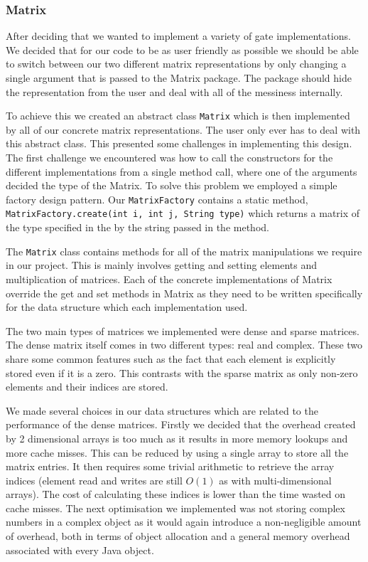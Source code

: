 \documentclass[bibliography=totocnumbered, 10pt]{article}
\theoremstyle{NoticeStyle}
\begin{document}
\subsubsection{Matrix}
After deciding that we wanted to implement a variety of gate implementations. We decided that for our code to be as user friendly as possible we should be able to switch between our two different matrix representations by only changing a single argument that is passed to the Matrix package. The package should hide the representation from the user and deal with all of the messiness internally.

To achieve this we created an abstract class \texttt{Matrix} which is then implemented by all of our concrete matrix representations. The user only ever has to deal with this abstract class. This presented some challenges in implementing this design. The first challenge we encountered was how to call the constructors for the different implementations from a single method call, where one of the arguments decided the type of the Matrix. To solve this problem we employed a simple factory design pattern. Our \texttt{MatrixFactory} contains a static method, \texttt{MatrixFactory.create(int i, int j, String type)} which returns a matrix of the type specified in the by the string passed in the method.

The \texttt{Matrix} class contains methods for all of the matrix manipulations we require in our project. This is mainly involves getting and setting elements and multiplication of matrices. Each of the concrete implementations of Matrix override the get and set methods in Matrix as they need to be written specifically for the data structure which each implementation used.

The two main types of matrices we implemented were dense and sparse matrices. The dense matrix itself comes in two different types: real and complex. These two share some common features such as the fact that each element is explicitly stored even if it is a zero. This contrasts with the sparse matrix as only non-zero elements and their indices are stored.

We made several choices in our data structures which are related to the performance of the dense matrices. Firstly we decided that the overhead created by 2 dimensional arrays is too much as it results in more memory lookups and more cache misses. This can be reduced by using a single array to store all the matrix entries. It then requires some trivial arithmetic to retrieve the array indices (element read and writes are still $O(1)$ as with multi-dimensional arrays). The cost of calculating these indices is lower than the time wasted on cache misses. 
The next optimisation we implemented was not storing complex numbers in a complex object as it would again introduce a non-negligible amount of overhead, both in terms of object allocation and a general memory overhead associated with every Java object.
\end{document}
